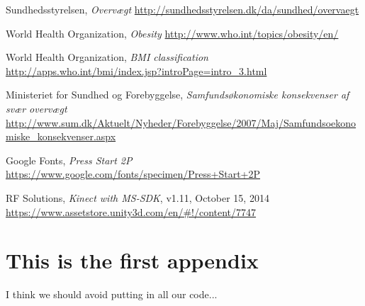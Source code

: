 \documentclass[11pt]{report}
\begin{document}
\begin{thebibliography}{9}
  Sundhedsstyrelsen,
  \emph{Overv\ae gt}
  \url{http://sundhedsstyrelsen.dk/da/sundhed/overvaegt}

	World Health Organization,
	\emph{Obesity}
	\url{http://www.who.int/topics/obesity/en/}
	
	World Health Organization,
	\emph{BMI classification}
	\url{http://apps.who.int/bmi/index.jsp?introPage=intro_3.html}

	Ministeriet for Sundhed og Forebyggelse,
	\emph{Samfunds\o konomiske konsekvenser af sv\ae r overv\ae gt}
	\url{http://www.sum.dk/Aktuelt/Nyheder/Forebyggelse/2007/Maj/Samfundsoekonomiske_konsekvenser.aspx}

	Google Fonts, \emph{Press Start 2P}
	\url{https://www.google.com/fonts/specimen/Press+Start+2P}
	
	RF Solutions, \emph{Kinect with MS-SDK}, v1.11, October 15, 2014
	\url{https://www.assetstore.unity3d.com/en/#!/content/7747}

\end{thebibliography}


\appendix

\chapter{This is the first appendix}
I think we should avoid putting in all our code...
\end{document}
